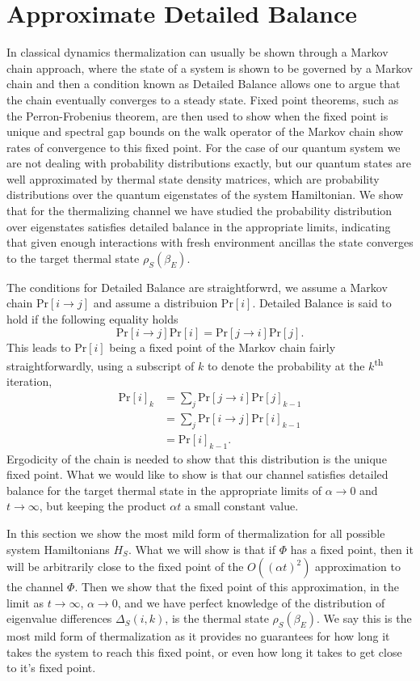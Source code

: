 \documentclass{article}
\newcommand{\prob}[1]{\text{Pr}\left[ #1 \right]}
\newcommand{\bigo}[1]{O\left( #1 \right)}
\newcommand{\ts}{\textsuperscript}
\begin{document}
\section{Approximate Detailed Balance}
In classical dynamics thermalization can usually be shown through a Markov chain approach, where the state of a system is shown to be governed by a Markov chain and then a condition known as Detailed Balance allows one to argue that the chain eventually converges to a steady state. Fixed point theorems, such as the Perron-Frobenius theorem, are then used to show when the fixed point is unique and spectral gap bounds on the walk operator of the Markov chain show rates of convergence to this fixed point. For the case of our quantum system we are not dealing with probability distributions exactly, but our quantum states are well approximated by thermal state density matrices, which are probability distributions over the quantum eigenstates of the system Hamiltonian. We show that for the thermalizing channel we have studied the probability distribution over eigenstates satisfies detailed balance in the appropriate limits, indicating that given enough interactions with fresh environment ancillas the state converges to the target thermal state $\rho_S(\beta_E)$.

The conditions for Detailed Balance are straightforwrd, we assume a Markov chain $\prob{i \to j }$ and assume a distribuion $\prob{i}$. Detailed Balance is said to hold if the following equality holds
\begin{equation}
    \prob{i \to j} \prob{i} = \prob{j \to i} \prob{j}.
\end{equation}
This leads to $\prob{i}$ being a fixed point of the Markov chain fairly straightforwardly, using a subscript of $k$ to denote the probability at the $k$\ts{th} iteration,
\begin{align}
    \prob{i}_k &= \sum_{j} \prob{j \to i} \prob{j}_{k - 1} \\
    &= \sum_j \prob{i \to j} \prob{i}_{k - 1} \\
    &= \prob{i}_{k - 1}.
\end{align}
Ergodicity of the chain is needed to show that this distribution is the unique fixed point. What we would like to show is that our channel satisfies detailed balance for the target thermal state in the appropriate limits of $\alpha \to 0$ and $t \to \infty$, but keeping the product $\alpha t$ a small constant value.


In this section we show the most mild form of thermalization for all possible system Hamiltonians $H_S$. What we will show is that if $\Phi$ has a fixed point, then it will be arbitrarily close to the fixed point of the $\bigo{(\alpha t)^2}$ approximation to the channel $\Phi$. Then we show that the fixed point of this approximation, in the limit as $t \to \infty$, $\alpha \to 0$, and we have perfect knowledge of the distribution of eigenvalue differences $\Delta_S(i,k)$, is the thermal state $\rho_S(\beta_E)$. We say this is the most mild form of thermalization as it provides no guarantees for how long it takes the system to reach this fixed point, or even how long it takes to get close to it's fixed point. 
\end{document}
